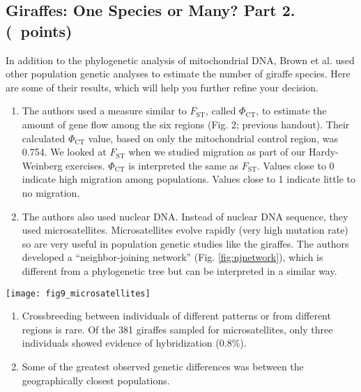 \documentclass[11pt, addpoints]{exam}
\begin{document}
\subsection*{Giraffes: One Species or Many? Part 2. (\numpoints\ points)}

In addition to the phylogenetic analysis of mitochondrial DNA, Brown et
al. used other population genetic analyses to estimate the number of
giraffe species. Here are some of their results, which will help you
further refine your decision.

\begin{enumerate}
\item
  The authors used a measure similar to $F_\mathrm{ST}$,
  called $\Phi_{\mathrm{CT}}$, to estimate the amount of gene flow among
  the six regions (Fig. 2; previous handout). Their calculated $\Phi_{\mathrm{CT}}$ value,
  based on only the mitochondrial control region, was 0.754. We looked
  at $F_\mathrm{ST}$ when we studied migration as part of our
  Hardy-Weinberg exercises. $\Phi_{\mathrm{CT}}$ is interpreted the same
  as $F_\mathrm{ST}$. Values close to 0 indicate high
  migration among populations. Values close to 1 indicate little to no migration.
\item
  The authors also used nuclear DNA. Instead of nuclear DNA sequence,
  they used microsatellites. Microsatellites evolve rapidly (very high
  mutation rate) so are very useful in population genetic studies like the
  giraffes. The authors developed a ``neighbor-joining network'' (Fig.
  \ref{fig:njnetwork}), which is different from a phylogenetic tree but can be interpreted
  in a similar way.
\end{enumerate}


\begin{center}
	\texttt{[image: fig9\_microsatellites]}
\end{center}


\begin{enumerate}
\item
  Crossbreeding between individuals of different patterns or from
  different regions is rare. Of the 381 giraffes sampled for
  microsatellites, only three individuals showed evidence of
  hybridization (0.8\%).
\item
  Some of the greatest observed genetic differences was between the geographically closest
  populations.
\end{enumerate}
\end{document}
